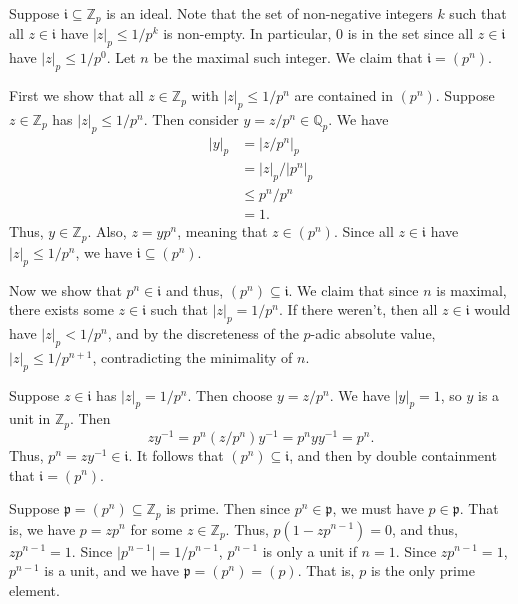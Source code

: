 \documentclass[12 pt, letterpaper]{hmcpset}
\begin{document}
\begin{solution}
	Suppose $\mathfrak{i} \subseteq \mathbb{Z}_{p}$ is an ideal. Note that the set of non-negative integers $k$ such that all  $z \in \mathfrak{i}$ have $\lvert z \rvert_{p} \le 1 / p^{k}$ is non-empty. In particular, $0$ is in the set since all $z \in \mathfrak{i}$ have $\lvert z \rvert_{p} \le 1 / p^{0}$. Let $n$ be the maximal such integer. We claim that $\mathfrak{i} = (p^{n})$.

	First we show that all $z \in \mathbb{Z}_{p}$ with $\lvert z \rvert_{p} \le 1 / p^{n}$ are contained in $(p^{n})$. Suppose $z \in \mathbb{Z}_{p}$ has $\lvert z \rvert_{p} \le 1 / p^{n}$. Then consider $y = z / p^{n} \in \mathbb{Q}_{p}$. We have
	\begin{align*}
		\lvert y \rvert_{p} & = \lvert z / p^{n} \rvert_{p} \\
				    & = \lvert z \rvert_{p} / \lvert p^{n} \rvert_{p} \\
				    & \le p^{n} / p^{n} \\
				    & = 1.
	\end{align*}
	Thus, $y \in \mathbb{Z}_{p}$. Also, $z = y p^{n}$, meaning that $z \in (p^{n})$. Since all $z \in \mathfrak{i}$ have $\lvert z \rvert_{p} \le 1 / p^{n}$, we have $\mathfrak{i} \subseteq (p^{n})$.


	Now we show that $p^{n} \in \mathfrak{i}$ and thus, $(p^{n}) \subseteq \mathfrak{i}$. We claim that since $n$ is maximal, there exists some $z \in \mathfrak{i}$ such that $\lvert z \rvert_{p} = 1 / p^{n}$. If there weren't, then all $z \in \mathfrak{i}$ would have $\lvert z \rvert_{p} < 1 / p^{n}$, and by the discreteness of the $p$-adic absolute value, $\lvert z \rvert_{p} \le 1 / p^{n + 1}$, contradicting the minimality of $n$.

	Suppose $z \in \mathfrak{i}$ has $\lvert z \rvert_{p} = 1 / p^{n}$. Then choose $y = z / p^{n}$. We have $\lvert y \rvert_{p} = 1$, so $y$ is a unit in $\mathbb{Z}_{p}$. Then
	\[
		z y^{-1} = p^{n} (z / p^{n}) y^{-1} = p^{n} y y^{-1} = p^{n}.
	\]
	Thus, $p^{n} = z y^{-1} \in \mathfrak{i}$. It follows that $(p^{n}) \subseteq \mathfrak{i}$, and then by double containment that $\mathfrak{i} = (p^{n})$.

	Suppose $\mathfrak{p} = (p^{n}) \subseteq \mathbb{Z}_{p}$ is prime. Then since $p^{n} \in \mathfrak{p}$, we must have $p \in \mathfrak{p}$. That is, we have $p = z p^{n}$ for some $z \in \mathbb{Z}_{p}$. Thus, $p(1 - z p^{n - 1}) = 0$, and thus,  $z p^{n - 1} = 1$. Since $\lvert p^{n - 1} \rvert = 1 / p^{n - 1}$, $p^{n - 1}$ is only a unit if $n = 1$. Since $z p^{n - 1} = 1$, $p^{n - 1}$ is a unit, and we have $\mathfrak{p} = (p^{n}) = (p)$. That is, $p$ is the only prime element.
\end{solution}
\end{document}
